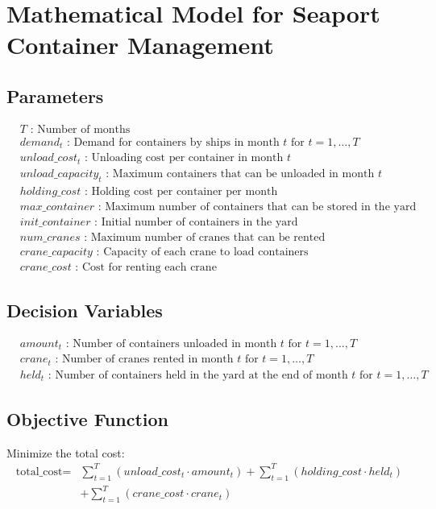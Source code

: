 \documentclass{article}
\begin{document}
\section*{Mathematical Model for Seaport Container Management}

\subsection*{Parameters}
\begin{align*}
& T \text{ : Number of months} \\
& demand_{t} \text{ : Demand for containers by ships in month } t \text{ for } t = 1, \ldots, T \\
& unload\_cost_{t} \text{ : Unloading cost per container in month } t \\
& unload\_capacity_{t} \text{ : Maximum containers that can be unloaded in month } t \\
& holding\_cost \text{ : Holding cost per container per month} \\
& max\_container \text{ : Maximum number of containers that can be stored in the yard} \\
& init\_container \text{ : Initial number of containers in the yard} \\
& num\_cranes \text{ : Maximum number of cranes that can be rented} \\
& crane\_capacity \text{ : Capacity of each crane to load containers} \\
& crane\_cost \text{ : Cost for renting each crane}
\end{align*}

\subsection*{Decision Variables}
\begin{align*}
& amount_{t} \text{ : Number of containers unloaded in month } t \text{ for } t = 1, \ldots, T \\
& crane_{t} \text{ : Number of cranes rented in month } t \text{ for } t = 1, \ldots, T \\
& held_{t} \text{ : Number of containers held in the yard at the end of month } t \text{ for } t = 1, \ldots, T
\end{align*}

\subsection*{Objective Function}
Minimize the total cost:
\begin{align*}
\text{total\_cost} = & \sum_{t=1}^{T} (unload\_cost_{t} \cdot amount_{t}) + \sum_{t=1}^{T} (holding\_cost \cdot held_{t}) \\
& + \sum_{t=1}^{T} (crane\_cost \cdot crane_{t})
\end{align*}
\end{document}
